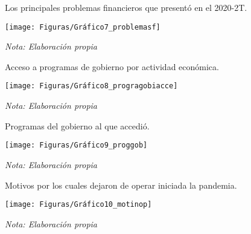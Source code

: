 \documentclass[12pt]{article}
\begin{document}
            \begin{figure}[H]
                \centering
                \caption{Los principales problemas financieros que presentó en el 2020-2T.}
                \texttt{[image: Figuras/Gráfico7\_problemasf]}
                \caption*{\it Nota: Elaboración propia}
                \label{fig: problemasf}
            \end{figure}
            \begin{figure}[H]
                \centering
                \caption{Acceso a programas de gobierno por actividad económica.}
                \texttt{[image: Figuras/Gráfico8\_progragobiacce]}
                \caption*{\it Nota: Elaboración propia}
                \label{fig: progragobiacce}
            \end{figure}
            \begin{figure}[H]
                \centering
                \caption{Programas del gobierno al que accedió.}
                \texttt{[image: Figuras/Gráfico9\_proggob]}
                \caption*{\it Nota: Elaboración propia}
                \label{fig: proggob}
            \end{figure}
            \begin{figure}[H]
                \centering
                \caption{Motivos por los cuales dejaron de operar iniciada la pandemia.}
                \texttt{[image: Figuras/Gráfico10\_motinop]}
                \caption*{\it Nota: Elaboración propia}
                \label{fig: motinop}
            \end{figure}
\end{document}
